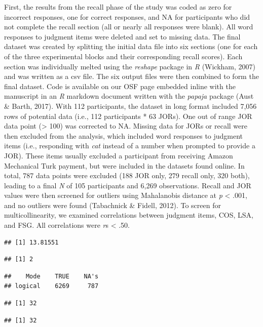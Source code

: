 \documentclass[english,,man]{apa6}
\begin{document}
First, the results from the recall phase of the study was coded as zero
for incorrect responses, one for correct responses, and NA for
participants who did not complete the recall section (all or nearly all
responses were blank). All word responses to judgment items were deleted
and set to missing data. The final dataset was created by splitting the
initial data file into six sections (one for each of the three
experimental blocks and their corresponding recall scores). Each section
was individually melted using the \emph{reshape} package in \emph{R}
(Wickham, 2007) and was written as a csv file. The six output files were
then combined to form the final dataset. Code is available on our OSF
page embedded inline with the manuscript in an \emph{R} markdown
document written with the \emph{papaja} package (Aust \& Barth, 2017).
With 112 participants, the dataset in long format included 7,056 rows of
potential data (i.e., 112 participants * 63 JORs). One out of range JOR
data point (\textgreater{} 100) was corrected to NA. Missing data for
JORs or recall were then excluded from the analysis, which included word
responses to judgment items (i.e., responding with \emph{cat} instead of
a number when prompted to provide a JOR). These items usually excluded a
participant from receiving Amazon Mechanical Turk payment, but were
included in the datasets found online. In total, 787 data points were
excluded (188 JOR only, 279 recall only, 320 both), leading to a final
\emph{N} of 105 participants and 6,269 observations. Recall and JOR
values were then screened for outliers using Mahalanobis distance at
\emph{p} \textless{} .001, and no outliers were found (Tabachnick \&
Fidell, 2012). To screen for multicollinearity, we examined correlations
between judgment items, COS, LSA, and FSG. All correlations were
\emph{r}s \textless{} .50.

\begin{verbatim}
## [1] 13.81551
\end{verbatim}

\begin{verbatim}
## [1] 2
\end{verbatim}

\begin{verbatim}
##    Mode    TRUE    NA's 
## logical    6269     787
\end{verbatim}

\begin{verbatim}
## [1] 32
\end{verbatim}

\begin{verbatim}
## [1] 32
\end{verbatim}
\end{document}
